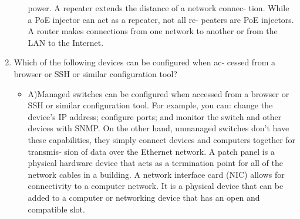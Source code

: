 \documentclass{article}
\begin{document}
\begin{enumerate}
\begin{itemize}
power. A repeater extends the distance of a network connec‐
tion. While a PoE injector can act as a repeater, not all re‐
peaters are PoE injectors. A router makes connections from
one network to another or from the LAN to the Internet.
    \end{itemize}
    \item Which of the following devices can be configured when ac‐
cessed from a browser or SSH or similar configuration tool?
    \begin{itemize}
        \item A)Managed switches can be configured when accessed from a
browser or SSH or similar configuration tool. For example,
you can: change the device’s IP address; configure ports; and
monitor the switch and other devices with SNMP. On the other
hand, unmanaged switches don’t have these capabilities, they
simply connect devices and computers together for transmis‐
sion of data over the Ethernet network. A patch panel is a
physical hardware device that acts as a termination point for all
of the network cables in a building. A network interface card
(NIC) allows for connectivity to a computer network. It is a
physical device that can be added to a computer or networking
device that has an open and compatible slot.
    \end{itemize}

\end{enumerate}
\end{document}
